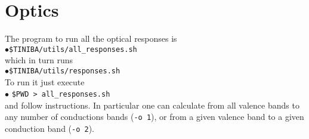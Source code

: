 \chapter{Optics}
 
The program to run all the optical responses is\\
$\bullet$\verb=$TINIBA/utils/all_responses.sh=\\ 
which in turn runs\\
$\bullet$\verb=$TINIBA/utils/responses.sh=\\
To run it just execute\\
$\bullet$ \verb=$PWD > all_responses.sh= \\
and follow instructions. In particular one can calculate from all
valence bands to any number of conductions bands (\verb=-o 1=),
or from a given valence band to a given conduction band (\verb=-o 2=).

